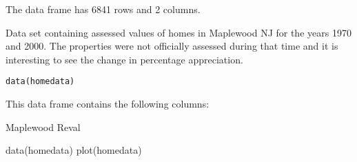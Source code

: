 \begin{Description}\relax
The  data frame has 6841 rows and 2 columns.

Data set containing assessed values of homes in Maplewood NJ for the
years 1970 and 2000. The properties were not officially assessed
during that time and it is interesting to see the change in percentage 
appreciation.
\end{Description}
\begin{Usage}
\begin{verbatim}data(homedata)\end{verbatim}
\end{Usage}
\begin{Format}\relax
This data frame contains the following columns:
\end{Format}
\begin{Source}\relax
Maplewood Reval
\end{Source}
\begin{Examples}
\begin{ExampleCode}
data(homedata)
plot(homedata)
\end{ExampleCode}
\end{Examples}

